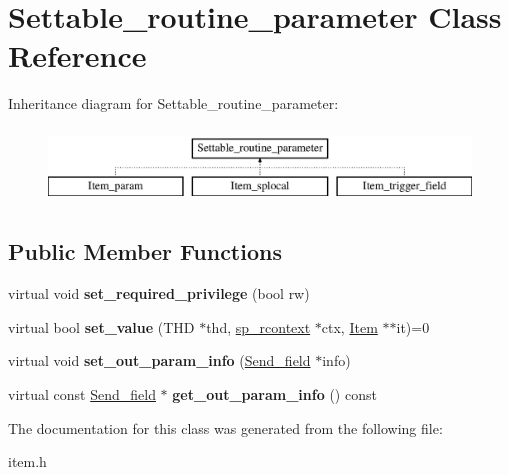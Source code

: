 \hypertarget{classSettable__routine__parameter}{}\section{Settable\+\_\+routine\+\_\+parameter Class Reference}
\label{classSettable__routine__parameter}
Inheritance diagram for Settable\+\_\+routine\+\_\+parameter\+:\begin{figure}[H]
\begin{center}
\leavevmode
\includegraphics[height=2.000000cm]{classSettable__routine__parameter}
\end{center}
\end{figure}
\subsection*{Public Member Functions}
\begin{DoxyCompactItemize}
\item 
\mbox{\label{classSettable__routine__parameter_a07adb288b198f11b730359839ec0b79b}} 
virtual void {\bfseries set\+\_\+required\+\_\+privilege} (bool rw)
\item 
\mbox{\label{classSettable__routine__parameter_ac56e6509950d7f297b708972a2fe8423}} 
virtual bool {\bfseries set\+\_\+value} (T\+HD $\ast$thd, \mbox{\hyperlink{classsp__rcontext}{sp\+\_\+rcontext}} $\ast$ctx, \mbox{\hyperlink{classItem}{Item}} $\ast$$\ast$it)=0
\item 
\mbox{\label{classSettable__routine__parameter_a22ee9f4cef990d2793fea59d1a4095a4}} 
virtual void {\bfseries set\+\_\+out\+\_\+param\+\_\+info} (\mbox{\hyperlink{classSend__field}{Send\+\_\+field}} $\ast$info)
\item 
\mbox{\label{classSettable__routine__parameter_ad7cd05e1bc0cf6b46971038103274c42}} 
virtual const \mbox{\hyperlink{classSend__field}{Send\+\_\+field}} $\ast$ {\bfseries get\+\_\+out\+\_\+param\+\_\+info} () const
\end{DoxyCompactItemize}


The documentation for this class was generated from the following file\+:\begin{DoxyCompactItemize}
\item 
item.\+h\end{DoxyCompactItemize}
